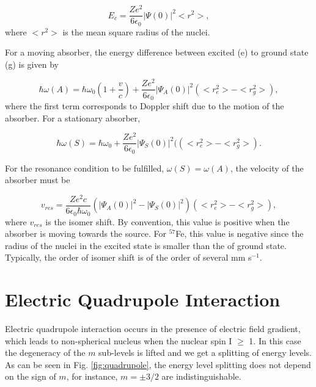 \documentclass[a4paper]{report}
\numberwithin{equation}{section}
\begin{document}
\begin{equation}
		E_{c} = \frac{Z e^2}{6 \epsilon_{0}} \left| \Psi(0) \right|^2 <r^2>,
\end{equation}
where $<r^2>$ is the mean square radius of the nuclei. 

For a moving absorber, the energy difference between excited (e) to ground state (g) is given by

\begin{equation}
		\hbar \omega (A) = \hbar \omega _{0} \left( 1 + \frac{v}{c} \right) + \frac{Z e^2}{6 \epsilon_{0}} \left| \Psi_{A}(0) \right| ^2 (<r_{e}^2> - <r_{g}^2> ),
\end{equation}
where the first term corresponds to Doppler shift due to the motion of the absorber. For a stationary absorber, 

\begin{equation}
		\hbar \omega (S) = \hbar \omega _{0} + \frac{Z e^2}{6 \epsilon_{0}} \left| \Psi_{S} (0) \right| ^2 ((<r_{e}^2> - <r_{g}^2> ).
\end{equation}

For the resonance condition to be fulfilled, $\omega (S) = \omega (A)$, the velocity of the absorber must be

\begin{equation}
		v_{res} = \frac{Z e^2 c}{6 \epsilon_{0} \hbar \omega _{0}} \left( \left| \Psi_{A} (0) \right|^2 - \left| \Psi_{S} (0) \right| ^2 \right) \left( <r_{e}^2> - < r_{g}^2 > \right), 
\end{equation}
where $v_{res}$ is the isomer shift. By convention, this value is positive when the absorber is moving towards the source. For $^{57}$Fe, this value is negative since the radius of the nuclei in the excited state is smaller than the of ground state. Typically, the order of isomer shift is of the order of several mm s$^{-1}$. 

\section{Electric Quadrupole Interaction}

Electric quadrupole interaction occurs in the presence of electric field gradient, which leads to non-spherical nucleus when the nuclear spin I $\geq$ 1. In this case the degeneracy of the $m$ sub-levels is lifted and we get a splitting of energy levels. As can be seen in Fig. \ref{fig:quadrupole}, the energy level splitting does not depend on the sign of $m$, for instance, $m = \pm 3 / 2$ are indistinguishable.    
\end{document}
